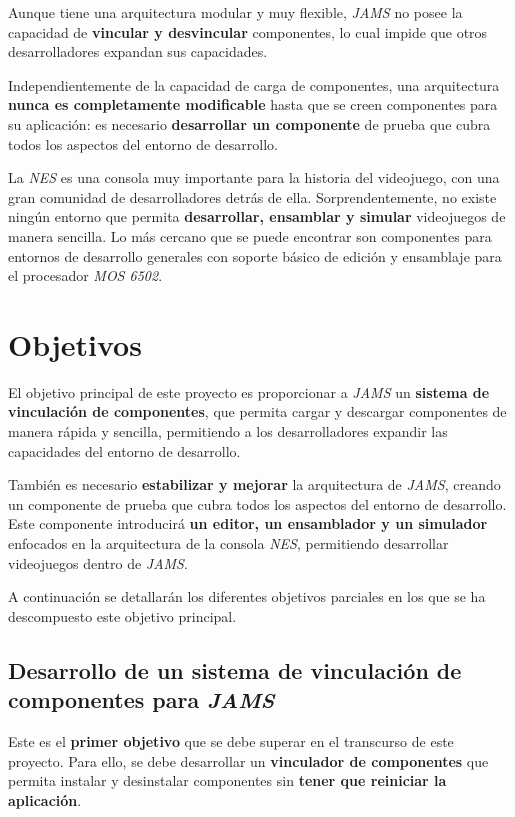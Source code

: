 Aunque tiene una arquitectura modular y muy flexible, \textit{JAMS}
no posee la capacidad de \textbf{vincular y desvincular}
componentes, lo cual impide que otros desarrolladores expandan sus capacidades.

Independientemente de la capacidad de carga de componentes,
una arquitectura \textbf{nunca es completamente modificable} hasta que
se creen componentes para su aplicación: es necesario
\textbf{desarrollar un componente} de prueba que cubra
todos los aspectos del entorno de desarrollo.

La \textit{NES} es una consola muy importante para la historia
del videojuego, con una gran comunidad de desarrolladores detrás
de ella.
Sorprendentemente, no existe ningún entorno que permita
\textbf{desarrollar, ensamblar y simular} videojuegos de manera sencilla.
Lo más cercano que se puede encontrar son componentes
para entornos de desarrollo generales con soporte básico de edición y
ensamblaje para el procesador \textit{MOS 6502}.


\section{Objetivos}\label{sec:objetivos}

El objetivo principal de este proyecto es proporcionar a \textit{JAMS}
un \textbf{sistema de vinculación de componentes}, que permita cargar
y descargar componentes de manera rápida y sencilla, permitiendo
a los desarrolladores expandir las capacidades del entorno de desarrollo.

También es necesario \textbf{estabilizar y mejorar}
la arquitectura de \textit{JAMS}, creando un componente
de prueba que cubra todos los aspectos del entorno de desarrollo.
Este componente introducirá \textbf{un editor, un ensamblador y un simulador}
enfocados en la arquitectura de la consola \textit{NES}, permitiendo
desarrollar videojuegos dentro de \textit{JAMS}.

A continuación se detallarán los diferentes objetivos parciales en los
que se ha descompuesto este objetivo principal.

\subsection{Desarrollo de un sistema de vinculación de componentes para \textit{JAMS}}
\label{subsec:desarrollo-de-un-sistema-de-vinculacion-de-componentes-para-jams}

Este es el \textbf{primer objetivo} que se debe superar en el transcurso de este
proyecto.
Para ello, se debe desarrollar un \textbf{vinculador de componentes} que permita
instalar y desinstalar componentes sin \textbf{tener que reiniciar la aplicación}.

